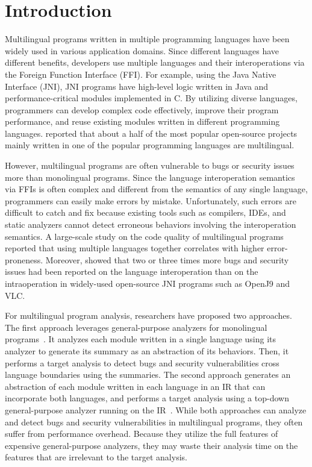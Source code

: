 \section{Introduction}
Multilingual programs written in multiple programming languages
have been widely used in various application domains.
Since different languages have different benefits,
developers use multiple languages and their interoperations
via the Foreign Function Interface (FFI). For example, using the Java Native Interface (JNI),
JNI programs have high-level logic written in Java and performance-critical
modules implemented in C. By utilizing diverse languages, programmers can
develop complex code effectively, improve their program performance,
and reuse existing modules written in different programming languages.
\citet{kochhar2016large} reported that about a half of the most popular open-source
projects mainly written in one of the popular programming languages are
multilingual.

However, multilingual programs are often vulnerable to bugs or security issues
more than monolingual programs. Since the language interoperation semantics
via FFIs is often complex and different from the semantics of any
single language, programmers can easily make errors by mistake.
Unfortunately, such errors are difficult to catch and fix because existing
tools such as compilers, IDEs, and static analyzers cannot detect erroneous
behaviors involving the interoperation semantics.
A large-scale study on the code quality of multilingual programs~\cite{kochhar2016large}
reported that using multiple languages together correlates with higher error-proneness.  
Moreover, \citet{grichi2020impact} showed that two or three times more
bugs and security issues had been reported on the language
interoperation than on the intraoperation in widely-used open-source JNI
programs such as OpenJ9 and VLC.

For multilingual program analysis, researchers have proposed two approaches.
The first approach leverages general-purpose analyzers for monolingual
programs~\cite{JN-SAF, LeeASE20}.  It analyzes each module
written in a single language using its analyzer to generate
its summary as an abstraction of its behaviors.  Then, it performs a target
analysis to detect bugs and security vulnerabilities cross language boundaries
using the summaries. The second approach generates an abstraction
of each module written in each language in an IR that can
incorporate both languages, and performs
a target analysis using a top-down general-purpose analyzer
running on the IR~\cite{hybridroid, cpython}.
While both approaches can analyze and detect bugs and security vulnerabilities
in multilingual programs, they often suffer from performance overhead.
Because they utilize the full features of expensive general-purpose analyzers,
they may waste their analysis time on the features that are irrelevant to
the target analysis.

